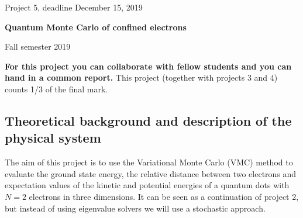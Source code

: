 \documentclass[%
oneside,                 %
final,                   %
10pt]{article}
\begin{document}

\newcommand{\exercisesection}[1]{\subsection*{#1}}






\thispagestyle{empty}

\begin{center}
{\LARGE\bf
\begin{spacing}{1.25}
Project 5, deadline  December 15, 2019
\end{spacing}
}
\end{center}


\begin{center}
{\bf Quantum Monte Carlo of confined electrons${}^{}$} \\ [0mm]
\end{center}

\begin{center}
\end{center}
    

\begin{center}
Fall semester 2019
\end{center}

\vspace{1cm}


\textbf{For this project you can collaborate with fellow students and you can  hand in a common report.}
This project (together with projects 3 and 4) counts 1/3 of the final mark.

\subsection*{Theoretical background and description of the physical system}

The aim of this project is to use the Variational Monte Carlo (VMC)
method to evaluate the ground state energy, the relative distance between two electrons and
expectation values of the kinetic and potential energies of a quantum dots with $N=2$
electrons in three dimensions. It can be seen as a continuation of project 2, but instead of using eigenvalue solvers
we will use a stochastic approach.
\end{document}

